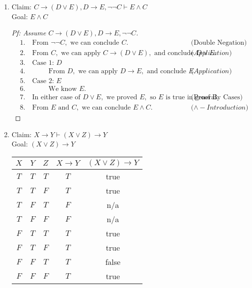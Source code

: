 \documentclass{article}
\begin{document}
\begin{enumerate}
\begin{enumerate}
        \item
        Claim: $C \rightarrow (D \lor E), D \rightarrow E, \neg \neg C \vdash E \land C$ \\
        Goal: $E \land C$
        \begin{proof}[Pf: Assume $C \rightarrow (D \lor E), D \rightarrow E, \neg \neg C$]
            \begin{align*}
                &1. \quad \text{From } \neg \neg C, \text{ we can conclude } C. && \text{(Double Negation)} \\
                &2. \quad \text{From } C, \text{ we can apply } C \rightarrow (D \lor E), \text{ and conclude } D \lor E. && \text{($Application$)} \\
                &3. \quad \text{Case 1: } D \\
                &4. \quad \hspace{1cm} \text{From } D, \text{ we can apply } D \rightarrow E, \text{ and conclude } E. && \text{($Application$)} \\
                &5. \quad \text{Case 2: } E \\
                &6. \quad \hspace{1cm} \text{We know } E. \\
                &7. \quad \text{In either case of } D \lor E, \text{ we proved } E, \text{ so } E \text{ is true in general.} && \text{(Proof By Cases)} \\
                &8. \quad \text{From } E \text{ and } C, \text{ we can conclude } E \land C. && \text{($\land - Introduction$)}
            \end{align*}
        \end{proof}

        \item
        Claim: $X \rightarrow Y \vdash (X \lor Z) \rightarrow Y$ \\
        Goal: $(X \lor Z) \rightarrow Y$ \\
        \begin{tabular}{| c | c | c | c | c |}
            \hline
            $X$ & $Y$ & $Z$ & $X \rightarrow Y$ & $(X \lor Z) \rightarrow Y$ \\
            \hline
            $T$ & $T$ & $T$ & $T$ & true \\
            \hline
            $T$ & $T$ & $F$ & $T$ & true \\
            \hline
            $T$ & $F$ & $T$ & $F$ & n/a \\
            \hline
            $T$ & $F$ & $F$ & $F$ & n/a \\
            \hline
            $F$ & $T$ & $T$ & $T$ & true \\
            \hline
            $F$ & $T$ & $F$ & $T$ & true \\
            \hline
            $F$ & $F$ & $T$ & $T$ & false \\
            \hline
            $F$ & $F$ & $F$ & $T$ & true \\
            \hline
        \end{tabular}


\end{enumerate}
\end{enumerate}
\end{document}
